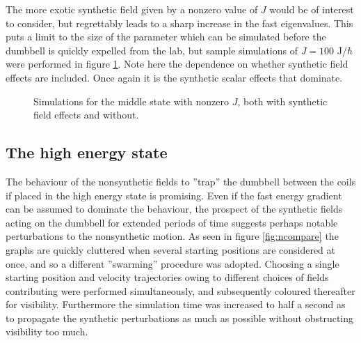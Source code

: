 \documentclass[main.tex]{subfiles}
\begin{document}
The more exotic synthetic field given by a nonzero value of \(J\) would be of interest to
consider, but regrettably leads to a sharp increase in the fast eigenvalues. This puts a
limit to the size of the parameter which can be simulated before the dumbbell is quickly
expelled from the lab, but sample simulations of \(J = 100\) J/\(\hbar{}\) were performed
in figure \ref{fig:n1Je2}. Note here the dependence on whether synthetic field effects are
included. Once again it is the synthetic scalar effects that dominate.
\begin{figure}[h]
    \centering
    \qquad
    \caption{\centering Simulations for the middle state with nonzero \(J\), both with synthetic field
    effects and without.}%
    \label{fig:n1Je2}
\end{figure}


\subsection{The high energy state}\label{sec:reshigh}
The behaviour of the nonsynthetic fields to ''trap'' the dumbbell between the coils if
placed in the high energy state is promising. Even if the fast energy gradient can be
assumed to dominate the behaviour, the prospect of the synthetic fields acting on the
dumbbell for extended periods of time suggests perhaps notable perturbations to the
nonsynthetic motion. As seen in figure \ref{fig:ncompare} the graphs are quickly cluttered
when several starting positions are considered at once, and so a different ''swarming''
procedure was adopted. Choosing a single starting position and velocity trajectories owing
to different choices of fields contributing were performed simultaneously, and subsequently
coloured thereafter for visibility. Furthermore the simulation time was increased to half a
second as to propagate the synthetic perturbations as much as possible without obstructing
visibility too much.
\end{document}
